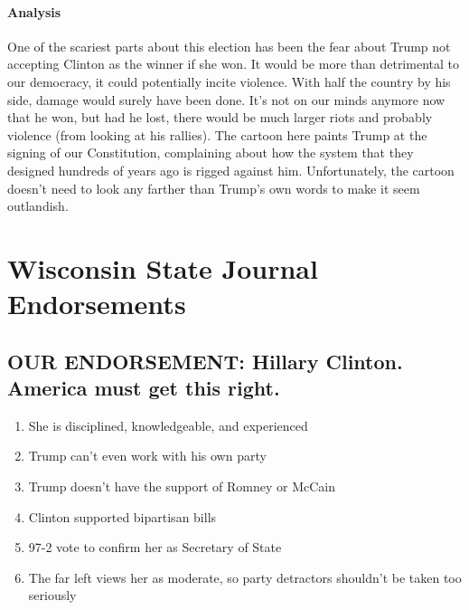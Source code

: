 \documentclass[twoside]{article}
\begin{document}
              \paragraph{Analysis} One of the scariest parts about this election has been the fear about Trump not accepting Clinton as the winner if she won. It would be more than
              detrimental to our democracy, it could potentially incite violence. With half the country by his side, damage would surely have been done. It's not on our minds anymore
              now that he won, but had he lost, there would be much larger riots and probably violence (from looking at his rallies). The cartoon here paints Trump at the signing of
              our Constitution, complaining about how the system that they designed hundreds of years ago is rigged against him. Unfortunately, the cartoon doesn't need to look any
              farther than Trump's own words to make it seem outlandish.
              \newpage
              \section{Wisconsin State Journal Endorsements}
              \subsection{OUR ENDORSEMENT: Hillary Clinton. America must get this right.
              }
              \begin{enumerate}[*]
                \item She is disciplined, knowledgeable, and experienced
                \item Trump can’t even work with his own party
                \item Trump doesn’t have the support of Romney or McCain
                \item Clinton supported bipartisan bills
                \item 97-2 vote to confirm her as Secretary of State
                \item The far left views her as moderate, so party detractors shouldn’t be taken too seriously
              \end{enumerate}
\end{document}
